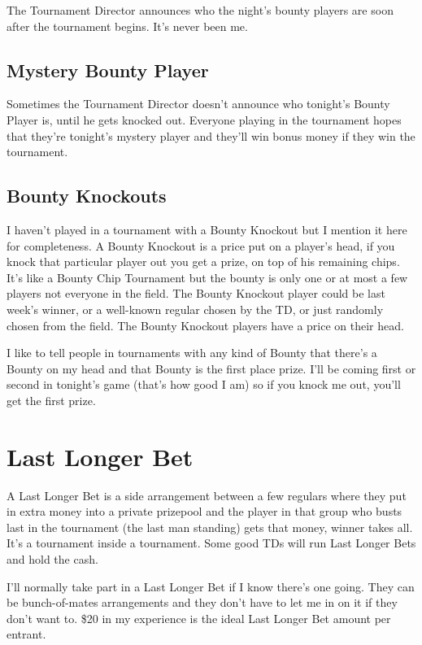 The Tournament Director announces who the night's bounty players
are soon after the tournament begins. It's never been me.

\subsection{Mystery Bounty Player}

Sometimes the Tournament Director doesn't announce who tonight's
Bounty Player is, until he gets knocked out. Everyone playing in the
tournament hopes that they're tonight's mystery player and they'll
win bonus money if they win the tournament.

\subsection{Bounty Knockouts}

I haven't played in a tournament with a Bounty Knockout but I
mention it here for completeness. A Bounty Knockout is a price
put on a player's head, if you knock that particular player out
you get a prize, on top of his remaining chips. It's like a
Bounty Chip Tournament but the bounty is only one or at most
a few players not everyone in the field. The Bounty Knockout player
could be last week's winner, or a well-known regular chosen
by the TD, or just randomly chosen from the field. The Bounty Knockout
players have a price on their head.

I like to tell people in tournaments with any kind of Bounty
that there's a Bounty on my head and that Bounty is the first
place prize. I'll be coming first or second in tonight's game (that's
how good I am) so if you knock me out, you'll get the first prize.

\section{Last Longer Bet}

A Last Longer Bet is a side arrangement between a few regulars
where they put in extra money into a private prizepool and the player
in that group who busts last in the tournament (the last man standing)
gets that money, winner takes all. It's a tournament inside a tournament.
Some good TDs will run Last Longer Bets and hold the cash.

I'll normally take part in a Last Longer Bet if I know there's one
going. They can be bunch-of-mates arrangements and
they don't have to let me in on it if they don't want to. \$20 in my
experience is the ideal Last Longer Bet amount per entrant.

